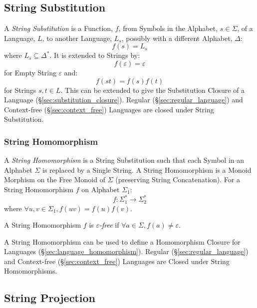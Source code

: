 \subsection{String Substitution}\label{sec:string_substitution}

A \emph{String Substitution} is a Function, $f$, from Symbols in the
Alphabet, $s \in \Sigma$, of a Language, $L$, to another Language,
$L_s$, possibly with a different Alphabet, $\Delta$:
\[
  f(s) = L_s
\]
where $L_s \subseteq \Delta^*$. It is extended to Strings by:
\[
  f(\varepsilon) = \varepsilon
\]
for Empty String $\varepsilon$ and:
\[
  f(st) = f(s)f(t)
\]
for Strings $s,t \in L$. This can be extended to give the Substitution
Closure of a Language (\S\ref{sec:substitution_closure}). Regular
(\S\ref{sec:regular_language}) and Context-free
(\S\ref{sec:context_free}) Languages are closed under String
Substitution.



\subsubsection{String Homomorphism}\label{sec:string_homomorphism}

A \emph{String Homomorphism} is a String Substitution such that each
Symbol in an Alphabet $\Sigma$ is replaced by a Single String. A
String Homomorphism is a Monoid Morphism on the Free Monoid of
$\Sigma$ (preserving String Concatenation). For a String Homomorphism
$f$ on Alphabet $\Sigma_1$:
\[
  f : \Sigma_1^* \rightarrow \Sigma_2^*
\]
where $\forall u,v \in \Sigma_1, f(uv) = f(u)f(v)$.

A String Homomorphism $f$ is \emph{$\varepsilon$-free} if $\forall a
\in \Sigma, f(a) \neq \varepsilon$.

A String Homomorphism can be used to define a Homomorphism Closure for
Languages (\S\ref{sec:language_homomorphism}). Regular
(\S\ref{sec:regular_language}) and Context-free
(\S\ref{sec:context_free}) Languages are Closed under String
Homomorphisms.



\subsection{String Projection}\label{sec:string_projection}

